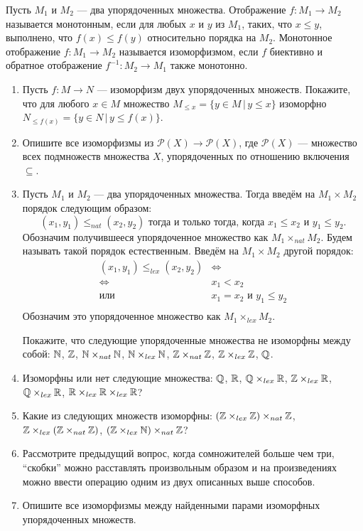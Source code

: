 Пусть $M_1$ и $M_2$ --- два упорядоченных множества. Отображение $f\colon M_1 \to M_2$ называется монотонным, если для любых $x$ и $y$ из $M_1$, таких, что $x\leq y$, выполнено, что $f(x)\leq f(y)$ относительно порядка на $M_2$. Монотонное отображение $f\colon M_1\to M_2$ называется изоморфизмом, если $f$ биективно и обратное отображение $f^{-1}\colon M_2 \to M_1$ также монотонно.
\begin{enumerate}
\item Пусть $f\colon M \to N$ --- изоморфизм двух упорядоченных множеств. Покажите, что для любого $x\in M$ множество $M_{\leq x}=\{y\in M\,|\, y\leq x\}$  изоморфно  $N_{\leq f(x)}=\{y\in N\,|\, y\leq f(x)\}$. 
\item Опишите все изоморфизмы из $\mathcal P(X) \to \mathcal P(X)$, где $\mathcal P(X)$ --- множество всех подмножеств множества $X$, упорядоченных по отношению включения $\subseteq$.
\item Пусть $M_1$ и $M_2$ --- два упорядоченных множества. Тогда введём на $M_1\times M_2$ порядок следующим образом:
 $$(x_1, y_1)\leq_{nat} (x_2,y_2) \text{ тогда и только тогда, когда } x_1\leq x_2 \text{ и } y_1\leq y_2.$$
Обозначим получившееся упорядоченное множество как $M_1\times_{nat}M_2$. Будем называть такой порядок естественным. Введём на $M_1\times M_2$ другой порядок:
\begin{align*}
(x_1, y_1)\leq_{lex} (x_2,y_2) & \Longleftrightarrow \\
\Longleftrightarrow\ \ & x_1< x_2\\
\text{или}\ \ & x_1=x_2 \text{ и } y_1\leq y_2 \\
\end{align*}
Обозначим это упорядоченное множество как $M_1\times_{lex} M_2$.

Покажите, что следующие упорядоченные множества не изоморфны между собой: $\mathbb{N}$, $\mathbb{Z}$, $\mathbb{N}\times_{nat} \mathbb{N}$, $\mathbb{N}\times_{lex} \mathbb{N}$, $\mathbb{Z}\times_{nat} \mathbb{Z}$, $\mathbb{Z}\times_{lex} \mathbb{Z}$, $\mathbb{Q}$.
\item Изоморфны или нет следующие множества: $\mathbb{Q}$, $\mathbb{R}$, $\mathbb{Q} \times_{lex} \mathbb{R}$, $\mathbb{Z} \times_{lex} \mathbb{R}$, $\mathbb{Q} \times_{lex} \mathbb{R}$, $\mathbb{R} \times_{lex} \mathbb{R} \times_{lex} \mathbb{R}$?
\item Какие из следующих множеств изоморфны: $(\mathbb{Z}\times_{lex} \mathbb{Z})\times_{nat} \mathbb{Z}$, $\mathbb{Z}\times_{lex} (\mathbb{Z}\times_{nat} \mathbb{Z})$, $(\mathbb{Z}\times_{lex} \mathbb{N})\times_{nat} \mathbb{Z}$?
\item Рассмотрите предыдущий вопрос, когда сомножителей больше чем три, ``скобки''  можно расставлять произвольным образом и на произведениях можно ввести операцию одним из двух описанных выше способов.
\item Опишите все изоморфизмы между найденными парами изоморфных упорядоченных множеств.
\end{enumerate}


